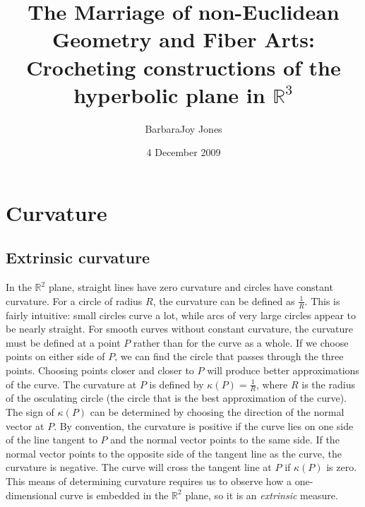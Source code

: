 \documentclass[letterpaper,titlepage]{article}
\title{The Marriage of non-Euclidean Geometry and Fiber Arts:\\
\bigskip
\Large{Crocheting constructions of the hyperbolic plane in $\mathbb{R}^3$}}
\author{BarbaraJoy Jones}
\date{4 December 2009}
\begin{document}
\maketitle


\section{Curvature}
\subsection{Extrinsic curvature}
In the $\mathbb{R}^2$ plane, straight lines have zero curvature and circles have constant curvature.
For a circle of radius $R$, the curvature can be defined as $\frac{1}{R}$.
This is fairly intuitive: small circles curve a lot, while arcs of very large circles appear to be nearly straight.\cite{adventures}
For smooth curves without constant curvature, the curvature must be defined at a point $P$ rather than for the curve as a whole.
If we choose points on either side of $P$, we can find the circle that passes through the three points.
Choosing points closer and closer to $P$ will produce better approximations of the curve.
The curvature at $P$ is defined by $\kappa(P) = \frac{1}{R}$, where $R$ is the radius of the osculating circle (the circle that is the best approximation of the curve).
The sign of $\kappa(P)$ can be determined by choosing the direction of the normal vector at $P$.
By convention, the curvature is positive if the curve lies on one side of the line tangent to $P$ and the normal vector points to the same side.
If the normal vector points to the opposite side of the tangent line as the curve, the curvature is negative.
The curve will cross the tangent line at $P$ if $\kappa(P)$ is zero.\cite{singer}
This means of determining curvature requires us to observe how a one-dimensional curve is embedded in the $\mathbb{R}^2$ plane, so it is an \emph{extrinsic} measure.
\end{document}
